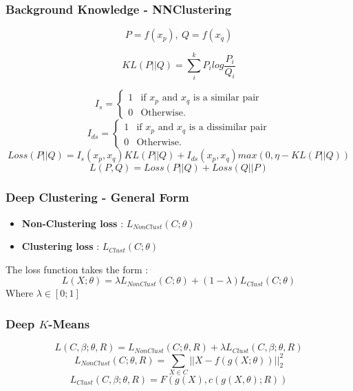 \documentclass{beamer}
\begin{document}
\begin{frame}
\frametitle{Background Knowledge - NNClustering}
\begin{equation*}
  P = f(x_p), ~ Q = f(x_q)
\end{equation*}

\begin{equation*}
  KL(P||Q) = \sum_i^k P_ilog\frac{P_i}{Q_i}
\end{equation*}

\begin{equation*}
  I_s = \left\{
\begin{array}{ll}
  1 & \mbox{if $x_p$ and $x_q$ is a similar pair}\\
  0 & \mbox{Otherwise.}
\end{array}
\right.
\end{equation*}
%
\begin{equation*}
  I_{ds} = \left\{
\begin{array}{ll}
  1 & \mbox{if $x_p$ and $x_q$ is a dissimilar pair}\\
  0 & \mbox{Otherwise.}
\end{array}
\right.
\end{equation*}
\begin{equation*}
  Loss(P || Q) = I_s(x_p, x_q)KL(P || Q) + I_{ds}(x_p, x_q)max(0,
  \eta-KL(P||Q))
\end{equation*}
\begin{equation*}
  L(P,Q) = Loss(P || Q) + Loss(Q || P)
\end{equation*}
\end{frame}


\begin{frame}
\frametitle{Deep Clustering - General Form}
\begin{itemize}
\item \textbf{Non-Clustering loss} : $L_{NonClust}(C;\theta)$
\item \textbf{Clustering loss} : $L_{Clust}(C;\theta)$
\end{itemize}
\pause
The loss function takes the form :
\begin{equation*}
L(X;\theta) = \lambda L_{NonClust}(C;\theta) + (1-\lambda)L_{Clust}(C; \theta)
\end{equation*}
Where $\lambda \in [0 ; 1]$

\end{frame}
\begin{frame}
  \frametitle{Deep $K$-Means }
\begin{equation*}
L(C ,\beta;\theta,R) = L_{NonClust}(C;\theta,R ) + \lambda L_{Clust}(C,\beta;\theta,R)
\end{equation*}
\begin{equation*}
L_{NonClust}(C;\theta,R ) = \sum_{X \in C} ||X - f(g(X;\theta))||_2^2
\end{equation*}
\begin{equation*}
  L_{Clust}(C,\beta;\theta,R) = F(g(X),c(g(X, \theta); R))
\end{equation*}
\end{frame}
\end{document}
